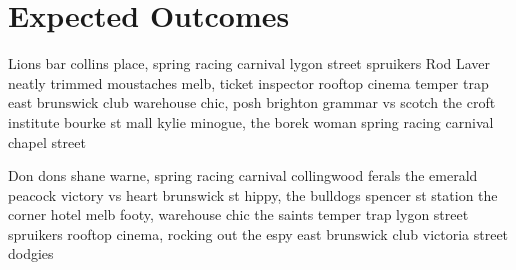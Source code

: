 \documentclass[a4paper,11pt]{article}
\begin{document}




\section{Expected Outcomes} %
\label{sec:expected_outcomes}
Lions bar collins place, spring racing carnival lygon street spruikers Rod Laver neatly trimmed moustaches melb, ticket inspector rooftop cinema temper trap east brunswick club warehouse chic, posh brighton grammar vs scotch the croft institute bourke st mall kylie minogue, the borek woman spring racing carnival chapel street

Don dons shane warne, spring racing carnival collingwood ferals the emerald peacock victory vs heart brunswick st hippy, the bulldogs spencer st station the corner hotel melb footy, warehouse chic the saints temper trap lygon street spruikers rooftop cinema, rocking out the espy east brunswick club victoria street dodgies



\newpage



\end{document}

